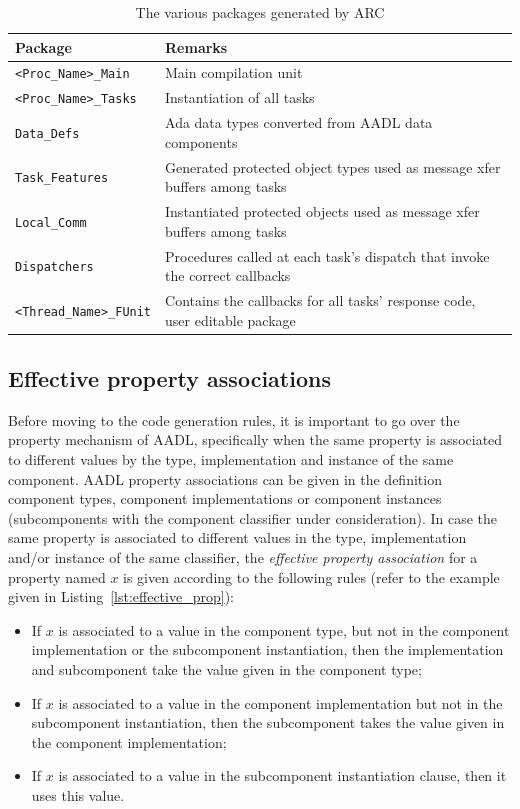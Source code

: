 \begin{table}
\begin{tabular}{|l|l|}
\hline
\textbf{Package} & \textbf{Remarks}\\
\hline
\texttt{<Proc\_Name>\_Main} & Main compilation unit\\
\texttt{<Proc\_Name>\_Tasks} & Instantiation of all tasks\\
\texttt{Data\_Defs} & Ada data types converted from AADL
data components\\
\texttt{Task\_Features} & Generated protected object
types used as message xfer buffers among tasks\\
\texttt{Local\_Comm} & Instantiated protected
objects used as message xfer buffers among tasks\\
\texttt{Dispatchers} & Procedures called at each
task's dispatch that invoke the correct callbacks\\
\texttt{<Thread\_Name>\_FUnit} & Contains the callbacks for all tasks'
response code, user editable package\\
\hline
\end{tabular}
\caption{The various packages generated by ARC}
\label{tab:packages}
\end{table}

\subsection{Effective property associations}
Before moving to the code generation rules, it is important to go over
the property mechanism of AADL, specifically when the same property is
associated to different values by the type, implementation and
instance of the same component. AADL property associations can be
given in the definition component types, component implementations or
component instances (subcomponents with the component classifier under
consideration). In case the same property is associated to different
values in the type, implementation and/or instance of the same
classifier, the \emph{effective property association} for a property
named $x$ is given according to the following rules (refer to the
example given in Listing~\ref{lst:effective_prop}):

\begin{itemize}
\item{If $x$ is associated to a value in the component type, but not
  in the component implementation or the subcomponent instantiation,
  then the implementation and subcomponent take the value given in the
  component type;}
\item{If $x$ is associated to a value in the component implementation
  but not in the subcomponent instantiation, then the subcomponent
  takes the value given in the component implementation;}
\item{If $x$ is associated to a value in the subcomponent
  instantiation clause, then it uses this value.}
\end{itemize}


